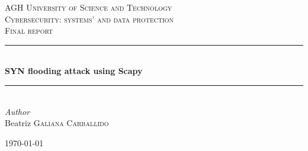 \documentclass[11pt]{article}
\begin{document}

\begin{titlepage} %
	\newcommand{\HRule}{\rule{\linewidth}{0.5mm}} %
	
	\center %
	
	
	\textsc{\LARGE AGH University of Science and Technology}\\[1.5cm] %
	
	\textsc{\Large Cybersecurity: systems' and data protection}\\[0.5cm] %
	
	\textsc{\large Final report}\\[0.5cm] %
	
	
	\HRule\\[0.4cm]
	
	{\huge\bfseries SYN flooding attack using Scapy}\\[0.4cm] %
	
	\HRule\\[1.5cm]
	
	
	{\large\textit{Author}}\\
	Beatriz \textsc{Galiana Carballido} %
	
	
	\vfill\vfill\vfill %
	
	{\large\today} %
	
	

\end{titlepage}
\end{document}
